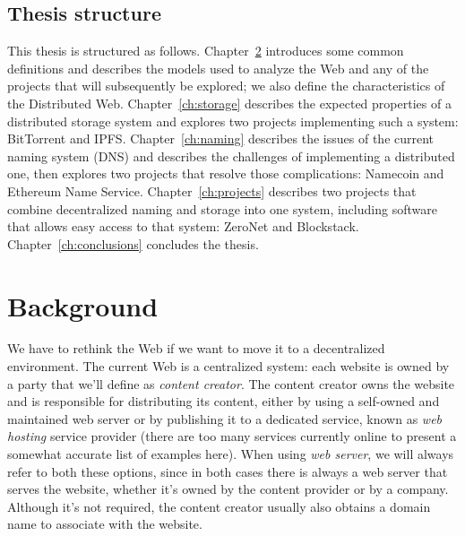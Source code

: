 \documentclass[mscthesis]{usiinfthesis}
\begin{document}
\section{Thesis structure}\label{sec:structure}
This thesis is structured as follows. Chapter~\ref{ch:background} introduces some common definitions and describes the models used to analyze the Web and any of the projects that will subsequently be explored; we also define the characteristics of the Distributed Web. Chapter~\ref{ch:storage} describes the expected properties of a distributed storage system and explores two projects implementing such a system: BitTorrent and IPFS. Chapter~\ref{ch:naming} describes the issues of the current naming system (DNS) and describes the challenges of implementing a distributed one, then explores two projects that resolve those complications: Namecoin and Ethereum Name Service. Chapter~\ref{ch:projects} describes two projects that combine decentralized naming and storage into one system, including software that allows easy access to that system: ZeroNet and Blockstack.
Chapter~\ref{ch:conclusions} concludes the thesis.

\chapter{Background} %
\label{ch:background}


We have to rethink the Web if we want to move it to a decentralized environment. The current Web is a centralized system: each website is owned by a party that we'll define as \textit{content creator}. The content creator owns the website and is responsible for distributing its content, either by using a self-owned and maintained web server or by publishing it to a dedicated service, known as \textit{web hosting} service provider (there are too many services currently online to present a somewhat accurate list of examples here). When using \textit{web server}, we will always refer to both these options, since in both cases there is always a web server that serves the website, whether it's owned by the content provider or by a company.
Although it's not required, the content creator usually also obtains a domain name to associate with the website.
\end{document}
